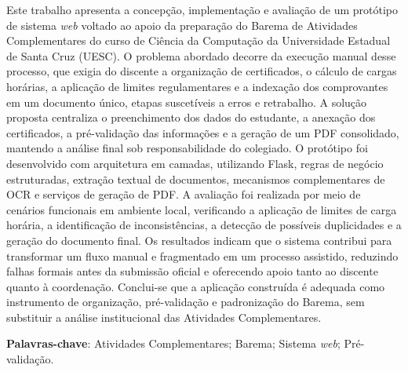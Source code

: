 
\setlength{\absparsep}{18pt} %
\begin{resumo}

Este trabalho apresenta a concepção, implementação e avaliação de um protótipo de sistema \textit{web} voltado ao apoio da preparação do Barema de Atividades Complementares do curso de Ciência da Computação da Universidade Estadual de Santa Cruz (UESC). O problema abordado decorre da execução manual desse processo, que exigia do discente a organização de certificados, o cálculo de cargas horárias, a aplicação de limites regulamentares e a indexação dos comprovantes em um documento único, etapas suscetíveis a erros e retrabalho. A solução proposta centraliza o preenchimento dos dados do estudante, a anexação dos certificados, a pré-validação das informações e a geração de um PDF consolidado, mantendo a análise final sob responsabilidade do colegiado. O protótipo foi desenvolvido com arquitetura em camadas, utilizando Flask, regras de negócio estruturadas, extração textual de documentos, mecanismos complementares de OCR e serviços de geração de PDF. A avaliação foi realizada por meio de cenários funcionais em ambiente local, verificando a aplicação de limites de carga horária, a identificação de inconsistências, a detecção de possíveis duplicidades e a geração do documento final. Os resultados indicam que o sistema contribui para transformar um fluxo manual e fragmentado em um processo assistido, reduzindo falhas formais antes da submissão oficial e oferecendo apoio tanto ao discente quanto à coordenação. Conclui-se que a aplicação construída é adequada como instrumento de organização, pré-validação e padronização do Barema, sem substituir a análise institucional das Atividades Complementares.

 \textbf{Palavras-chave}: Atividades Complementares; Barema; Sistema \textit{web}; Pré-validação.
\end{resumo}


